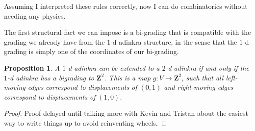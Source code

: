 \documentclass[12pt,twoside,singlespace]{article}
\numberwithin{equation}{section}
\newtheorem{prop}[equation]{Proposition}
\theoremstyle{definition}
\newcommand{\ZZ}{\mathbf{Z}}
\begin{document}
Assuming I interpreted these rules correctly, now I can do combinatorics without needing any physics.


The first structural fact we can impose is a bi-grading that is compatible with the grading we already have from the $1$-d adinkra structure, in the sense that the $1$-d grading is simply one of the coordinates of our bi-grading.

\begin{prop}
A $1$-d adinkra can be extended to a $2$-d adinkra if and only if the $1$-d adinkra has a \emph{bigrading} to $\ZZ^2$. This is a map $g: V \rightarrow \ZZ^2$, such that all left-moving edges correspond to displacements of $(0, 1)$ and right-moving edges correspond to displacements of $(1, 0)$.
\end{prop}

\begin{proof}
Proof delayed until talking more with Kevin and Tristan about the easiest way to write things up to avoid reinventing wheels.
\end{proof}



\end{document}
